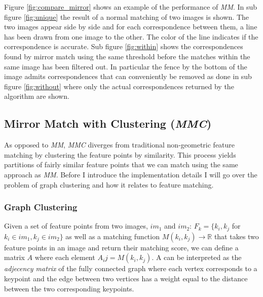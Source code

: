 \documentclass{article}
\begin{document}
Figure \ref{fig:compare_mirror} shows an example of the performance of 
\emph{MM}. In sub figure \ref{fig:unique} the result of a normal 
matching of two images is shown. The two images appear side by side and 
for each correspondence between them, a line has been drawn from one 
image to the other. The color of the line indicates if the 
correspondence is accurate. Sub figure \ref{fig:within} shows the 
correspondences found by mirror match using the same threshold before 
the matches within the same image has been filtered out. In particular 
the fence by the bottom of the image admits correspondences that can 
conveniently be removed as done in sub figure \ref{fig:without} where 
only the actual correspondences returned by the algorithm are shown.

\subsection{Mirror Match with Clustering (\emph{MMC})}

As opposed to \emph{MM}, \emph{MMC} diverges from traditional 
non-geometric feature matching by clustering the feature points by 
similarity. This process yields partitions of fairly similar feature 
points that we can match using the same approach as \emph{MM}. Before I 
introduce the implementation details I will go over the problem of graph 
clustering and how it relates to feature matching.

\subsubsection{Graph Clustering}

Given a set of feature points from two images, $im_1$ and $im_2$: $F_k = 
\{k_i, k_j$ for $k_i \in im_1, k_j \in im_2\}$ as well as a matching 
function $M(k_i, k_j) \rightarrow \mathbb{R}$ that takes two feature 
points in an image and return their matching score, we can define a 
matrix $A$ where each element $A_ij = M(k_i, k_j)$. A can be interpreted 
as the \emph{adjecency matrix} of the fully connected graph where each 
vertex corresponds to a keypoint and the edge between two vertices has a 
weight equal to the distance between the two corresponding keypoints.
\end{document}
